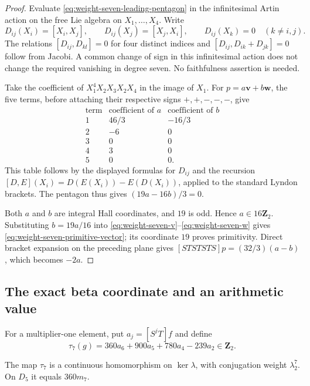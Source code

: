 \begin{proof}
Evaluate \eqref{eq:weight-seven-leading-pentagon} in the infinitesimal
Artin action on the free Lie algebra on $X_1,\ldots,X_4$. Write
\[
 D_{ij}(X_i)=[X_i,X_j],\qquad
 D_{ij}(X_j)=[X_j,X_i],\qquad D_{ij}(X_k)=0\quad(k\ne i,j).
\]
The relations $[D_{ij},D_{kl}]=0$ for four distinct indices and
$[D_{ij},D_{ik}+D_{jk}]=0$ follow from Jacobi. A common change of sign
in this infinitesimal action does not change the required vanishing
in degree seven. No faithfulness assertion is needed.

Take the coefficient of $X_1^4X_2X_3X_2X_4$ in the image of $X_1$.
For $p=a\mathbf v+b\mathbf w$, the five terms, before attaching
their respective signs $+,+,-,-,-$, give
\[
\begin{array}{c|rr}
\text{term}&\text{coefficient of }a&\text{coefficient of }b\\ \hline
1&46/3&-16/3\\
2&-6&0\\
3&0&0\\
4&3&0\\
5&0&0.
\end{array}
\]
This table follows by the displayed formulas for $D_{ij}$ and the
recursion $[D,E](X_i)=D(E(X_i))-E(D(X_i))$, applied to the standard
Lyndon brackets. The pentagon thus gives $(19a-16b)/3=0$.

Both $a$ and $b$ are integral Hall coordinates, and $19$ is odd.
Hence $a\in16\mathbf Z_2$. Substituting $b=19a/16$ into
\eqref{eq:weight-seven-v}--\eqref{eq:weight-seven-w} gives
\eqref{eq:weight-seven-primitive-vector}; its coordinate $19$ proves
primitivity. Direct bracket expansion on the preceding plane gives
$[STSTSTS]p=(32/3)(a-b)$, which becomes $-2a$.
\end{proof}

\subsection{The exact beta coordinate and an arithmetic value}

For a multiplier-one element, put $a_j=[S^jT]f$ and define
\begin{equation}\label{eq:weight-seven-tau}
 \tau_7(g)=360a_6+900a_5+780a_4-239a_2\in\mathbf Z_2.
\end{equation}

\begin{lemma}\label{lem:weight-seven-beta}
The map $\tau_7$ is a continuous homomorphism on $\ker\lambda$, with
conjugation weight $\lambda_2^7$. On $D_5$ it equals $360m_7$.
\end{lemma}

